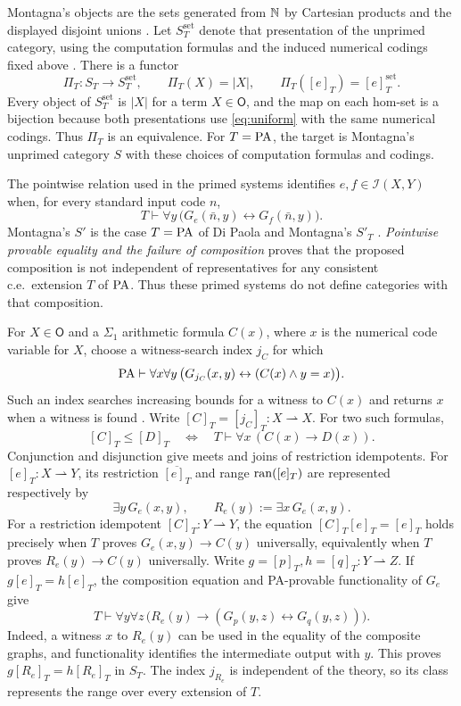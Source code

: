 Montagna's objects are the sets generated from $\mathbb N$ by
Cartesian products and the displayed disjoint unions
\cite[p.~105]{Montagna}. Let $S_T^{\mathrm{set}}$ denote that
presentation of the unprimed category, using the computation
formulas and the induced numerical codings fixed above
\cite{Montagna,DPM}. There is a functor
\[
 \Pi_T:S_T\longrightarrow S_T^{\mathrm{set}},\qquad
 \Pi_T(X)=|X|,\qquad \Pi_T([e]_T)=[e]_T^{\mathrm{set}}.
\]
Every object of $S_T^{\mathrm{set}}$ is $|X|$ for a term
$X\in\mathsf O$, and the map on each hom-set is a bijection
because both presentations use \eqref{eq:uniform} with the same
numerical codings. Thus $\Pi_T$ is an equivalence. For $T=\mathrm{PA}$,
the target is Montagna's unprimed category $S$ with these choices
of computation formulas and codings.

The pointwise relation used in the primed systems identifies
$e,f\in\mathcal I(X,Y)$ when, for every standard input code $n$,
\[
 T\vdash\forall y\,
   \bigl(G_e(\bar n,y)\leftrightarrow G_f(\bar n,y)\bigr).
\]
Montagna's $S'$ is the case
$T=\mathrm{PA}$ of Di Paola and Montagna's $S'_T$ \cite{Montagna,DPM}.
\emph{Pointwise provable equality and the failure of composition}
\cite[Corollary 2]{Composition} proves that the proposed composition
is not independent of representatives for any consistent c.e.\
extension $T$ of $\mathrm{PA}$. Thus these primed systems do not define
categories with that composition.

For $X\in\mathsf O$ and a $\Sigma_1$ arithmetic formula $C(x)$,
where $x$ is the numerical code variable for $X$, choose
a witness-search index $j_C$ for which
\[
 \mathrm{PA}\vdash\forall x\forall y\,
 \bigl(G_{j_C}(x,y)\leftrightarrow(C(x)\land y=x)\bigr).
\]
Such an index searches increasing bounds for a witness to $C(x)$
and returns $x$ when a witness is found
\cite[p.~109, equation~$(*)$]{Montagna}. Write
$[C]_T=[j_C]_T:X\rightharpoonup X$.
For two such formulas,
\begin{equation}\label{eq:domain-order}
 [C]_T\le[D]_T
 \quad\Longleftrightarrow\quad
 T\vdash\forall x\,(C(x)\longrightarrow D(x)).
\end{equation}
Conjunction and disjunction give meets and joins of restriction
idempotents. For $[e]_T:X\rightharpoonup Y$, its restriction
$\overline{[e]_T}$ and range $\operatorname{ran}([e]_T)$ are represented respectively by
\[
 \exists y\,G_e(x,y),\qquad
 R_e(y):=\exists x\,G_e(x,y).
\]
For a restriction idempotent $[C]_T:Y\rightharpoonup Y$, the
equation $[C]_T[e]_T=[e]_T$ holds precisely when
$T$ proves $G_e(x,y)\to C(y)$ universally, equivalently when
$T$ proves $R_e(y)\to C(y)$ universally.
Write $g=[p]_T,h=[q]_T:Y\rightharpoonup Z$.
If $g[e]_T=h[e]_T$, the
composition equation and PA-provable functionality of $G_e$ give
\[
 T\vdash\forall y\forall z\,
 \bigl(R_e(y)\longrightarrow
       (G_p(y,z)\leftrightarrow G_q(y,z))\bigr).
\]
Indeed, a witness $x$ to $R_e(y)$ can be used in the equality of
the composite graphs, and functionality identifies the intermediate
output with $y$. This proves $g[R_e]_T=h[R_e]_T$ in $S_T$.
The index $j_{R_e}$ is independent of the theory, so its class
represents the range over every extension of $T$.

